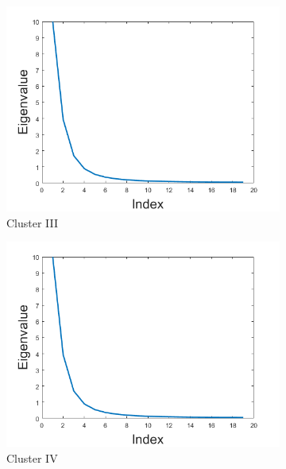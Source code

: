 \begin{figure}[H]
\begin{subfigure}[b]{0.4\textwidth}
\includegraphics[width=\textwidth]{figures_2/eig3}
\caption{Cluster III}
\end{subfigure}   
\begin{subfigure}[b]{0.4\textwidth}
\centering
\includegraphics[width=\textwidth]{figures_2/eig4}
\caption{Cluster IV}
\end{subfigure}   \\
\begin{subfigure}[b]{0.4\textwidth}
\centering

\end{subfigure}
\end{figure}
